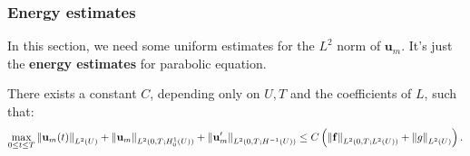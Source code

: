 \subsubsection{Energy estimates}
In this section, we need some uniform estimates for the $L^{2}$ norm of $\mathbf{u}_{m}$. It's just the \textbf{energy estimates} for parabolic equation.
\begin{theorem}
    There exists a constant $C$, depending only on $U,T$ and the coefficients of $L$, such that:
    \begin{equation}
        \label{eq:energy_estimate}
        \max_{0\le t\le T}\left\|\mathbf{u}_{m}(t)\right\|_{L^{2}(U)}+\left\|\mathbf{u}_{m}\right\|_{L^{2}(0,T;H_{0}^{1}(U))}+\left\|\mathbf{u}'_{m}\right\|_{L^{2}(0,T;H^{-1}(U))}\le C\left(\left\|\mathbf{f}\right\|_{L^{2}(0,T;L^{2}(U))}+\left\|g\right\|_{L^{2}(U)}\right).
    \end{equation}
\end{theorem}
